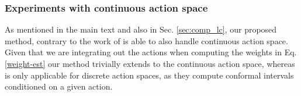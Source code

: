 \begin{table}[h!]
      \centering
      \caption{Mean Interval Length as a function of policy shift with 2 standard errors over 10 runs. We have added weighted quantile regression (WQR) for completeness and note that it does not seem to perform well.}\label{tab:length_toy_app}
\end{table}







\newpage
\subsubsection{Experiments with continuous action space}\label{subsec:cts_act}
As mentioned in the main text and also in Sec. \ref{sec:comp_lc}, our proposed method, contrary to the work of \cite{lei2020conformal} is able to also handle continuous action space. Given that we are integrating out the actions when computing the weights in Eq. \ref{weight-est} our method trivially extends to the continuous action space, whereas \cite{lei2020conformal} is only applicable for discrete action spaces, as they compute conformal intervals conditioned on a given action.

